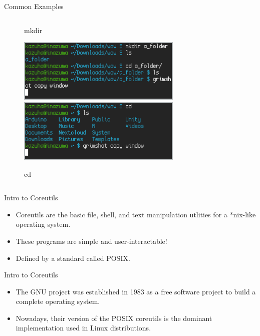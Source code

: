 \documentclass{beamer}
\begin{document}
\begin{frame}{Common Examples}
\begin{columns}
\begin{column}{0.33\textwidth}
\begin{figure}
				\caption{mkdir}
				\includegraphics[width=0.7\textwidth]{mkdir.png}
				\includegraphics[width=0.7\textwidth]{cd.png}
				\caption{cd}
			\end{figure}
		\end{column}
	\end{columns}
\end{frame}

\begin{frame}{Intro to Coreutils}
	\begin{itemize}
		\item Coreutils are the basic file, shell, and text manipulation
			utlities for a *nix-like operating system.
			\pause

		\item These programs are simple and user-interactable!
			\pause

		\item Defined by a standard called POSIX.
	\end{itemize}
\end{frame}

\begin{frame}{Intro to Coreutils}
	\begin{itemize}
		\item The GNU project was established in 1983 as a free software project
			to build a complete operating system.
			\pause

		\item Nowadays, their version of the POSIX coreutils is the dominant
			implementation used in Linux distributions.
	\end{itemize}
\end{frame}
\end{document}
